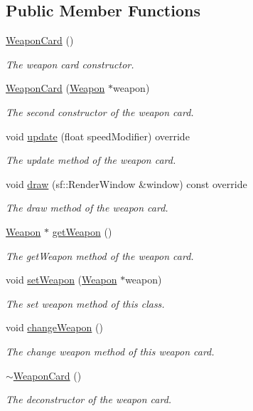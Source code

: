 \subsection*{Public Member Functions}
\begin{DoxyCompactItemize}
\item 
\hyperlink{class_weapon_card_ad4741d62814ccb8898b6d5530ecfe146}{Weapon\+Card} ()
\begin{DoxyCompactList}\small\item\em The weapon card constructor. \end{DoxyCompactList}\item 
\hyperlink{class_weapon_card_aeba9686102eabee16beba92eb6ccf9d8}{Weapon\+Card} (\hyperlink{class_weapon}{Weapon} $\ast$weapon)
\begin{DoxyCompactList}\small\item\em The second constructor of the weapon card. \end{DoxyCompactList}\item 
void \hyperlink{class_weapon_card_a160dc14db9e74b67537e74fcbf0a6e75}{update} (float speed\+Modifier) override
\begin{DoxyCompactList}\small\item\em The update method of the weapon card. \end{DoxyCompactList}\item 
void \hyperlink{class_weapon_card_a96b2a3317bbc9228dc22947ef3086883}{draw} (sf\+::\+Render\+Window \&window) const override
\begin{DoxyCompactList}\small\item\em The draw method of the weapon card. \end{DoxyCompactList}\item 
\hyperlink{class_weapon}{Weapon} $\ast$ \hyperlink{class_weapon_card_afe7e0c4ab0aa2fa0b3f2ef86a16cecc0}{get\+Weapon} ()
\begin{DoxyCompactList}\small\item\em The get\+Weapon method of the weapon card. \end{DoxyCompactList}\item 
void \hyperlink{class_weapon_card_a764285ce92ffbe9712ddd83a5b8a8402}{set\+Weapon} (\hyperlink{class_weapon}{Weapon} $\ast$weapon)
\begin{DoxyCompactList}\small\item\em The set weapon method of this class. \end{DoxyCompactList}\item 
void \hyperlink{class_weapon_card_a063b1986fe8bd4e62b55b6186b426b7d}{change\+Weapon} ()
\begin{DoxyCompactList}\small\item\em The change weapon method of this weapon card. \end{DoxyCompactList}\item 
\hyperlink{class_weapon_card_a8e657b50a65a34809a509e6f0a8abb26}{$\sim$\+Weapon\+Card} ()
\begin{DoxyCompactList}\small\item\em The deconstructor of the weapon card. \end{DoxyCompactList}\end{DoxyCompactItemize}
